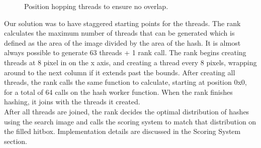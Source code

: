 \documentclass[10pt, journal]{vgtc}                %
\begin{document}
\begin{flushleft}
\begin{figure}[h!]
	\caption{Position hopping threads to ensure no overlap.}
\end{figure}
Our solution was to have staggered starting points for the threads. The rank calculates the maximum number of threads that can be generated which is defined as the area of the image divided by the area of the hash. It is almost always possible to generate 63 threads + 1 rank call. The rank begins creating threads at 8 pixel in on the x axis, and creating a thread every 8 pixels, wrapping around to the next column if it extends past the bounds. After creating all threads, the rank calls the same function to calculate, starting at position 0x0, for a total of 64 calls on the hash worker function. When the rank finishes hashing, it joins with the threads it created. \\
After all threads are joined, the rank decides the optimal distribution of hashes using the search image and calls the scoring system to match that distribution on the filled hitbox. Implementation details are discussed in the Scoring System section.
\end{flushleft}
\end{document}
